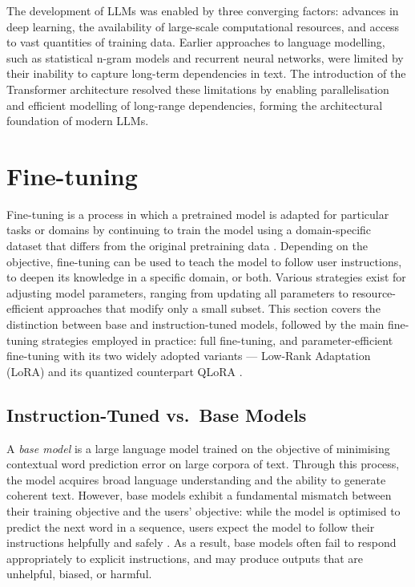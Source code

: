 The development of LLMs was enabled by three converging factors:
advances in deep learning, the availability of large-scale
computational resources, and access to vast quantities of
training data. Earlier approaches to language
modelling, such as statistical n-gram models and recurrent
neural networks, were limited by their inability to capture
long-term dependencies in text. The introduction of the Transformer architecture resolved these limitations by
enabling parallelisation and efficient modelling of long-range
dependencies, forming the architectural foundation of modern
LLMs.

\section{Fine-tuning}
\label{fine-tuning}

Fine-tuning is a process in which a pretrained model is
  adapted for particular tasks or domains by continuing to
  train the model using a domain-specific dataset that differs
  from the original pretraining data \cite{anisuzzaman2025}.
  Depending on the objective, fine-tuning can be used to teach
  the model to follow user instructions, to deepen its
  knowledge in a specific domain, or both. Various strategies
  exist for adjusting model parameters, ranging from updating
  all parameters to resource-efficient approaches that modify
  only a small subset. This section covers the distinction between base and
  instruction-tuned models, followed by the main fine-tuning
  strategies employed in practice: full fine-tuning, and
  parameter-efficient fine-tuning with its two widely adopted
  variants --- Low-Rank Adaptation (LoRA) \cite{hu2022lora} and its quantized
  counterpart QLoRA \cite{dettmers2023}.

\subsection{Instruction-Tuned vs.\ Base Models}
\label{sec:model-types}
A \textit{base model} is a large language model trained on
the objective of minimising contextual word prediction error
on large corpora of text. Through this process, the model
acquires broad language understanding and the ability to
generate coherent text. However, base models exhibit a
fundamental mismatch between their training objective and
the users' objective: while the model is optimised to
predict the next word in a sequence, users expect the model
to follow their instructions helpfully and safely
\cite{zhang2023}. As a result, base models often fail to
respond appropriately to explicit instructions, and may
produce outputs that are unhelpful, biased, or harmful.

